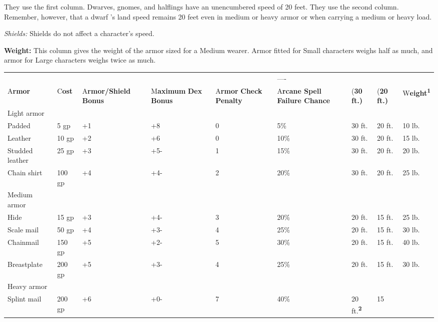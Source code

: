 \documentclass{article}
\begin{document}
They use the first column. Dwarves, gnomes, and halflings have an unencumbered 
speed of 20 feet. They use the second column. Remember, however, that a dwarf 's 
land speed remains 20 feet even in medium or heavy armor or when carrying a medium 
or heavy load.

\textit{Shields: }Shields do not affect a character's speed.

\textbf{Weight:} This column gives the weight of the armor sized for a Medium wearer. 
Armor fitted for Small characters weighs half as much, and armor for Large characters 
weighs twice as much.

\vspace{12pt}
\begin{tabular}{|>{\raggedright}p{58pt}|>{\raggedright}p{19pt}|>{\raggedright}p{36pt}|>{\raggedright}p{28pt}|>{\raggedright}p{35pt}|>{\raggedright}p{38pt}|>{\raggedright}p{17pt}|>{\raggedright}p{16pt}|>{\raggedright}p{20pt}|}
\hline
\multicolumn{9}{|p{272pt}|}{T\textbf{able: Armor and Shields}}\tabularnewline
\hline
  &  &  &  &  & ---- & \multicolumn{2}{p{33pt}|}{ \textbf{Speed ----}} & \tabularnewline
\hline
A\textbf{rmor} & C\textbf{ost} & A\textbf{rmor/Shield }\linebreak{}
\textbf{Bonus} & M\textbf{aximum }\linebreak{}
\textbf{Dex Bonus} & A\textbf{rmor }\linebreak{}
\textbf{Check Penalty} & A\textbf{rcane Spell }\linebreak{}
\textbf{Failure Chance} & (\textbf{30 ft.)} & (\textbf{20 ft.)} & W\textbf{eight}\textsuperscript{\textbf{1}}\tabularnewline
\hline
Light armor &  &  &  &  &  &  &  & \tabularnewline
\hline
Padded & 5 gp & +1 & +8 & 0 & 5\% & 30 ft. & 20 ft. & 10 lb.\tabularnewline
\hline
Leather & 10 gp & +2 & +6 & 0 & 10\% & 30 ft. & 20 ft. & 15 lb.\tabularnewline
\hline
Studded leather & 25 gp & +3 & +5- & 1 & 15\% & 30 ft. & 20 ft. & 20 lb.\tabularnewline
\hline
Chain shirt & 100 gp & +4 & +4- & 2 & 20\% & 30 ft. & 20 ft. & 25 lb.\tabularnewline
\hline
Medium armor &  &  &  &  &  &  &  & \tabularnewline
\hline
Hide & 15 gp & +3 & +4- & 3 & 20\% & 20 ft. & 15 ft. & 25 lb.\tabularnewline
\hline
Scale mail & 50 gp & +4 & +3- & 4 & 25\% & 20 ft. & 15 ft. & 30 lb.\tabularnewline
\hline
Chainmail & 150 gp & +5 & +2- & 5 & 30\% & 20 ft. & 15 ft. & 40 lb.\tabularnewline
\hline
Breastplate & 200 gp & +5 & +3- & 4 & 25\% & 20 ft. & 15 ft. & 30 lb.\tabularnewline
\hline
Heavy armor &  &  &  &  &  &  &  & \tabularnewline
\hline
Splint mail & 200 gp & +6 & +0- & 7 & 40\% & 20 ft.\textsuperscript{\textbf{2}} & 15 

\end{tabular}
\end{document}
